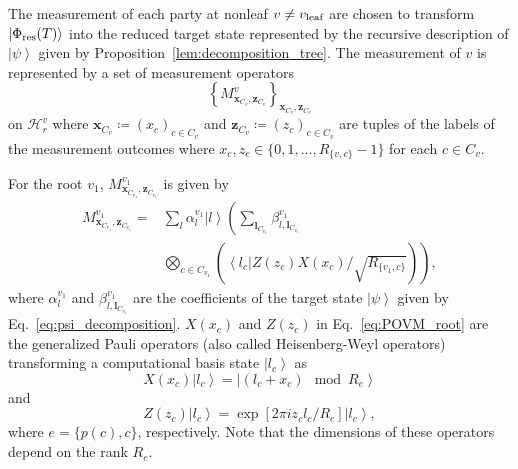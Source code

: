 \documentclass[preprintnumbers,aps,amsmath,amssymb,pra,twocolumn,showpacs,superscriptaddress,floatfix]{revtex4-1}
\def\Bra#1{\left\langle#1\right|}
\def\Ket#1{\left|#1\right\rangle}
\newcommand{\ket}[1]{|{#1}\rangle}
\theoremstyle{plain}
\theoremstyle{definition}
\theoremstyle{remark}
\begin{document}
The measurement of each party at nonleaf $v \neq v_{\textup{leaf}}$ are chosen to transform $\ket{\Phi_{\textup{res}}(T)}$ into the reduced target state represented by the recursive description of $\Ket{\psi}$ given by Proposition~\ref{lem:decomposition_tree}.  The measurement of $v$ is represented by a set of measurement operators
\[
     {\left\{M^v_{\boldsymbol{x}_{C_v},\boldsymbol{z}_{C_v}}\right\}}_{\boldsymbol{x}_{C_v},\boldsymbol{z}_{C_v}}
\]
on $\mathcal{H}_r^{v}$  where $\boldsymbol{x}_{C_v} \coloneqq{(x_c)}_{c\in C_v}$ and $\boldsymbol{z}_{C_v} \coloneqq{(z_c)}_{c\in C_v}$ are tuples of the labels of the measurement outcomes where $x_c, z_c \in \{ 0,1,\ldots,R_{\{v,c\}}-1\}$ for each $c\in C_v$. 

For the root $v_1$, $M^{v_1}_{\boldsymbol{x}_{C_{v_1}},\boldsymbol{z}_{C_{v_1}}}$ is given by
\begin{equation}
     \label{eq:POVM_root}
     \begin{split}
     M^{v_1}_{\boldsymbol{x}_{C_{v_1}},\boldsymbol{z}_{C_{v_1}}}  =&\sum_{l} \alpha^{v_1}_l\Ket{l}\left(\sum_{\boldsymbol{l}_{C_{v_1}}}\beta_{l,\boldsymbol{l}_{C_{v_1}}}^{v_1}\right.\\
         &\left.\bigotimes_{c\in C_{v_1}}
     \left(\Bra{l_c}Z(z_c)X(x_c)/\sqrt{R_{\{v_1,c\}}}\right)
                 \right),
     \end{split}
\end{equation}
where $\alpha^{v_1}_l$ and $\beta_{l,\boldsymbol{l}_{C_{v_1}}}^{v_1}$ are the coefficients of the target state $\Ket{\psi}$ given by Eq.~\eqref{eq:psi_decomposition}.  $X(x_c)$ and $Z(z_c)$ in Eq.~\eqref{eq:POVM_root} are the generalized Pauli operators (also called Heisenberg-Weyl operators)~\cite{Wilde} transforming a computational basis state $\Ket{l_c}$ as 
\begin{equation}
    X(x_c) \Ket{l_c}=\Ket{(l_c+x_c)\mod R_e}
    \label{eq:HWopx}
\end{equation}
and
\begin{equation}
    Z(z_c) \Ket{l_c}=\exp \left [2\pi i  z_c l_c / R_e \right] \Ket{l_c},
 \label{eq:HWopz}
\end{equation}
where  $e=\{p(c),c\}$, respectively.  Note that the dimensions of these operators depend on the rank $R_e$.
\end{document}
